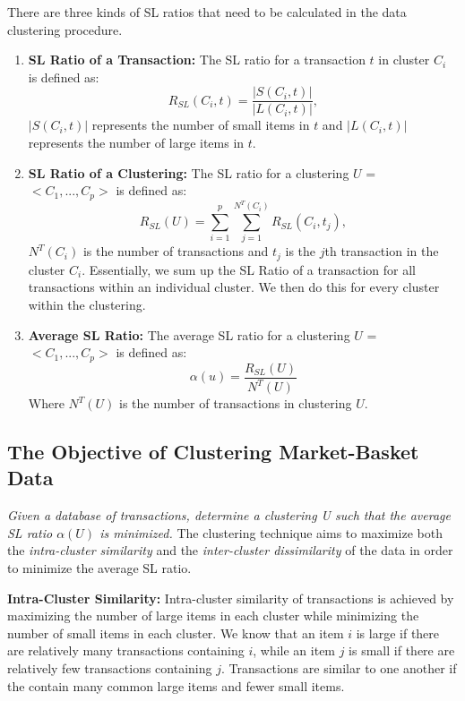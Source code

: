\documentclass[11pt,reqno]{amsart}
\theoremstyle{definition}
\numberwithin{equation}{subsection}
\begin{document}
There are three kinds of SL ratios that need to be calculated in the data clustering procedure.
	\begin{enumerate}


	\item \textbf{SL Ratio of a Transaction:} The SL ratio for a transaction $t$ in cluster $C_i$ is defined as:
	$$R_{SL}(C_i, t) = \frac{|S(C_i,t)|}{|L(C_i, t)|} ,$$
$|S(C_i,t)|$ represents the number of small items in $t$ and $|L(C_i,t)|$ represents the number of large items in $t$.


	\item \textbf{SL Ratio of a Clustering:} The SL ratio for a clustering $U$ = $<C_1, ..., C_p>$ is defined as:
	$$R_{SL}(U) = \sum_{i=1}^{p} \sum_{j=1}^{N^T(C_i)} R_{SL}(C_i, t_j), $$
	$N^T(C_i)$ is the number of transactions and $t_j$ is the $j$th transaction in the cluster $C_i$. Essentially, we sum up the SL Ratio of a transaction for all transactions within an individual cluster. We then do this for every cluster within the clustering.
	
	
	
	\item \textbf{Average SL Ratio:} The average SL ratio for a clustering $U$ = $<C_1, ..., C_p>$ is defined as:
	$$\alpha(u) = \frac{R_{SL}(U)}{N^T(U)}$$
	Where $N^T(U)$ is the number of transactions in clustering $U$.
	
	\end{enumerate}

\subsection{The Objective of Clustering Market-Basket Data}

{\em Given a database of transactions, determine a clustering U such that the average SL ratio $\alpha(U)$ is minimized.}  The clustering technique aims to maximize both the {\em intra-cluster similarity} and the {\em inter-cluster dissimilarity} of the data in order to minimize the average SL ratio. 

\textbf{Intra-Cluster Similarity:} Intra-cluster similarity of transactions is achieved by maximizing the number of large items in each cluster while minimizing the number of small items in each cluster. We know that an item $i$ is large if there are relatively many transactions containing $i$, while an item $j$ is small if there are relatively few transactions containing $j$. Transactions are similar to one another if the contain many common large items and fewer small items. 
\end{document}
